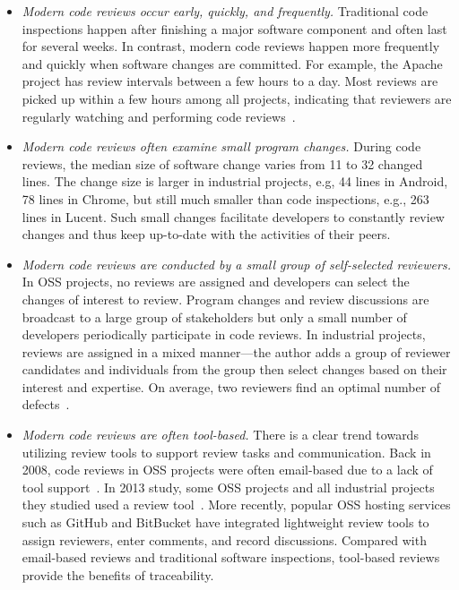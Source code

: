\begin{itemize}
\item {\it Modern code reviews occur early, quickly, and frequently.} Traditional code inspections happen after finishing a major software component and often last for several weeks. In contrast, modern code reviews happen more frequently and quickly when software changes are committed. For example, the Apache project has review intervals between a few hours to a day. Most reviews are picked up within a few hours among all projects, indicating that reviewers are regularly watching and performing code reviews~\cite{rigby2013convergent}.

\item {\it Modern code reviews often examine small program changes.} During code reviews, the median size of software change varies from 11 to 32 changed lines. The change size is larger in industrial projects, e.g, 44 lines in Android, 78 lines in Chrome, but still much smaller than code inspections, e.g., 263 lines in Lucent. Such small changes facilitate developers to constantly review changes and thus keep up-to-date with the activities of their peers. 
\item {\it Modern code reviews are conducted by a small group of self-selected reviewers.} In OSS projects, no reviews are assigned and developers can select the changes of interest to review. Program changes and review discussions are broadcast to a large group of stakeholders but only a small number of developers periodically participate in code reviews. In industrial projects, reviews are assigned in a mixed manner---the author adds a group of reviewer candidates and individuals from the group then select changes based on their interest and expertise. On average, two reviewers find an optimal number of defects~\cite{rigby2013convergent}.

\item {\it Modern code reviews are often tool-based.} There is a clear trend towards utilizing review tools to support review tasks and communication. Back in 2008, code reviews in OSS projects were often email-based due to a lack of tool support~\cite{Rigby2008:apache}. In 2013 study, some OSS projects and all industrial projects they studied used a review tool~\cite{rigby2013convergent}. More recently, popular OSS hosting services such as GitHub and BitBucket have integrated lightweight review tools to assign reviewers, enter comments, and record discussions. Compared with email-based reviews and traditional software inspections, tool-based reviews provide the benefits of traceability. 


\end{itemize}
